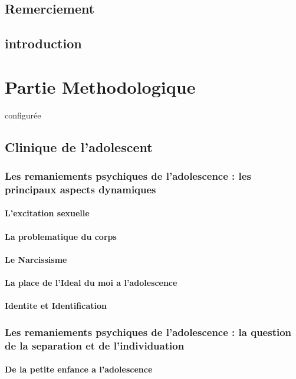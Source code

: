 \documentclass[a4paper]{report}
\begin{document}
\chapter{Remerciement}
\chapter{introduction}

\part{Partie Methodologique}
 configurée
\chapter{Clinique de l'adolescent}

\section{Les remaniements psychiques de l'adolescence : les principaux aspects dynamiques}
\subsection{L'excitation sexuelle}
\subsection{La problematique du corps}
\subsection{Le Narcissisme}
\subsection{La place de l'Ideal du moi a l'adolescence}
\subsection{Identite et Identification}

\section{Les remaniements psychiques de l'adolescence : la question de la separation et de l'individuation}
\subsection{De la petite enfance a l'adolescence}
\end{document}
